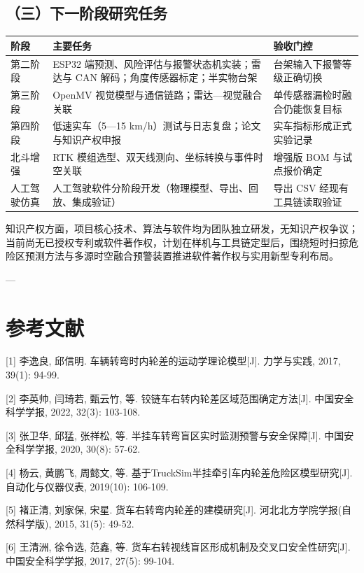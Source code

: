 \documentclass[UTF8,11pt]{ctexart}
\begin{document}
\subsection*{（三）下一阶段研究任务}
\begin{center}
\small
\begin{tabular}{p{2.2cm}p{7.4cm}p{4.2cm}}
\hline
\textbf{阶段} & \textbf{主要任务} & \textbf{验收门控} \\
\hline
第二阶段 & ESP32 端预测、风险评估与报警状态机实装；雷达与 CAN 解码；角度传感器标定；半实物台架 & 台架输入下报警等级正确切换 \\
\hline
第三阶段 & OpenMV 视觉模型与通信链路；雷达—视觉融合关联 & 单传感器漏检时融合仍能恢复目标 \\
\hline
第四阶段 & 低速实车（5—15 km/h）测试与日志复盘；论文与知识产权申报 & 实车指标形成正式实验记录 \\
\hline
北斗增强 & RTK 模组选型、双天线测向、坐标转换与事件时空关联 & 增强版 BOM 与试点报价确定 \\
\hline
人工驾驶仿真 & 人工驾驶软件分阶段开发（物理模型、导出、回放、集成验证） & 导出 CSV 经现有工具链读取验证 \\
\hline
\end{tabular}
\end{center}
知识产权方面，项目核心技术、算法与软件均为团队独立研发，无知识产权争议；当前尚无已授权专利或软件著作权，计划在样机与工具链定型后，围绕短时扫掠危险区预测方法与多源时空融合预警装置推进软件著作权与实用新型专利布局。

---

\section*{参考文献}
[1] 李逸良, 邱信明. 车辆转弯时内轮差的运动学理论模型[J]. 力学与实践, 2017, 39(1): 94-99.

[2] 李英帅, 闫琦若, 甄云竹, 等. 铰链车右转内轮差区域范围确定方法[J]. 中国安全科学学报, 2022, 32(3): 103-108.

[3] 张卫华, 邱猛, 张祥松, 等. 半挂车转弯盲区实时监测预警与安全保障[J]. 中国安全科学学报, 2020, 30(8): 57-62.

[4] 杨云, 黄鹏飞, 周懿文, 等. 基于TruckSim半挂牵引车内轮差危险区模型研究[J]. 自动化与仪器仪表, 2019(10): 106-109.

[5] 褚正清, 刘家保, 宋星. 货车右转弯内轮差的建模研究[J]. 河北北方学院学报(自然科学版), 2015, 31(5): 49-52.

[6] 王清洲, 徐令选, 范鑫, 等. 货车右转视线盲区形成机制及交叉口安全性研究[J]. 中国安全科学学报, 2017, 27(5): 99-104.
\end{document}
